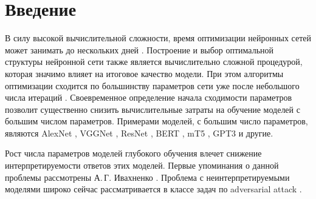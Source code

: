 \newpage


\section{Введение}
В силу высокой вычислительной сложности, время оптимизации нейронных сетей может занимать до нескольких дней \cite{sutskever2014}.
Построение и выбор оптимальной структуры нейронной сети также является вычислительно сложной процедурой, которая значимо влияет на итоговое качество модели. 
При этом алгоритмы оптимизации сходится по большинству параметров сети уже после небольшого числа итераций \cite{Chunyan2016}.
Своевременное определение начала сходимости параметров позволит существенно снизить вычислительные затраты на обучение моделей с большим числом параметров.
Примерами моделей, с большим число параметров, являются AlexNet \cite{Krizhevsky2012}, VGGNet \cite{Simonyan2014}, ResNet \cite{Kaiming2015}, BERT \cite{Devlin2018, Vaswani2017}, mT5 \cite{Linting2021}, GPT3\cite{Brown2020} и другие.

Рост числа параметров моделей глубокого обучения влечет снижение интерпретируемости ответов этих моделей.
Первые упоминания о данной проблемы рассмотрены А.\,Г. Ивахненко \cite{Ivakhnenko1994}.
Проблема с неинтерпретируемыми моделями широко сейчас рассматривается в классе задач по adversarial attack \cite{Zheng2020}.

